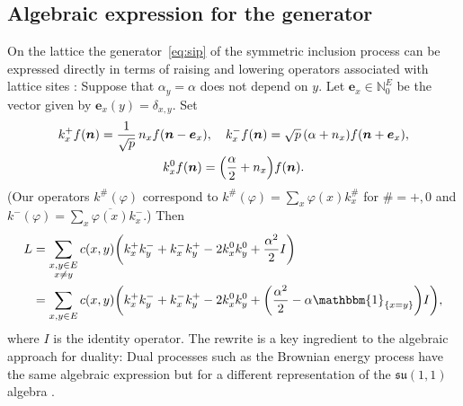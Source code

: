 \documentclass[10pt,a4paper]{amsart}
\numberwithin{equation}{section}
\newcommand{\N}{\mathbb{N}}
\newcommand{\vect}[1]{\boldsymbol{#1}}
\newcommand{\one}{\mathbbm{1}}
\newcommand{\1}{\mathbbm{1}}
\begin{document}
\subsection{Algebraic expression for the generator} \label{sec:alg-gen}


On the lattice the generator~\eqref{eq:sip} of the symmetric inclusion process can be expressed directly in terms of raising and lowering operators associated with lattice sites \cite{gkrv}: Suppose that $\alpha_y =\alpha$ does not depend on $y$. Let $\vect e_x \in \N_0^E$ be the vector given by $\vect e_x(y) = \delta_{x,y}$. Set
\begin{gather*}
	k_x^+ f(\vect n ) = \frac{1}{\sqrt p}\, n_x f(\vect n - \vect e_x),\quad
	k_x^- f(\vect n) = \sqrt p\, (\alpha + n_x) f(\vect n + \vect e_x),\\
	k_x^0 f(\vect n) = \Bigl( \frac \alpha 2 + n_x\Bigr) f(\vect n).
\end{gather*}
\big(Our operators $k^\#(\varphi)$ correspond to $k^\#(\varphi) = \!\sum_x \varphi(x) k_x^\#$ for $\#=+,0$ and $k^-(\varphi) =\! \sum_{x} \overline{\varphi(x)} k_x^-$.\big)
Then
\begin{align} \label{eq:sip-algebraic}
	L & = \notag \sum_{\substack{x,y\in E\\x \neq y}} c(x,y)\biggl( k_x^+ k_y^- + k_x^- k_y^+ - 2 k_x^0 k_y^0 + \frac{\alpha^2}{2} I \biggr) \\
 & = \sum_{x,y\in E} c(x,y)\biggl( k_x^+ k_y^- + k_x^- k_y^+ - 2 k_x^0 k_y^0 + \biggl(\frac{\alpha^2}{2} - \alpha \one_{\{x=y\}} \biggr) I \biggr),
\end{align}
where $I$ is the identity operator. The rewrite is a key ingredient to the algebraic approach for duality: Dual processes such as the Brownian energy process have the same algebraic expression but for a different representation of the $\mathfrak{su}(1,1)$ algebra \cite[Section~6.2]{gkrv}.
\end{document}
